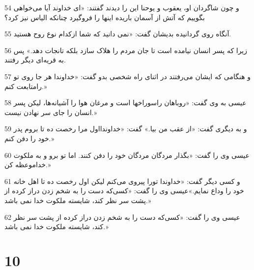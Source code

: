 \par 54 و چون شاگردان او، یعقوب و یوحنا این را دیدند گفتند: «ای خداوند آیا می‌خواهی بگوییم که آتش از آسمان باریده اینها را فرو‌گیرد چنانکه الیاس نیز کرد؟
\par 55 آنگاه روی گردانیده بدیشان گفت: «نمی دانید که شما ازکدام نوع روح هستید.
\par 56 زیرا که پسر انسان نیامده است تا جان مردم را هلاک سازد بلکه تانجات دهد.» پس به قریه‌ای دیگر رفتند.
\par 57 و هنگامی که ایشان می‌رفتند در اثنای راه شخصی بدو گفت: «خداوندا هر جا روی تو رامتابعت کنم.»
\par 58 عیسی به وی گفت: «روباهان راسوراخها است و مرغان هوا را آشیانه‌ها، لیکن پسر انسان را جای سر نهادن نیست.»
\par 59 و به دیگری گفت: «از عقب من بیا.» گفت: «خداوندااول مرا رخصت ده تا بروم پدر خود را دفن کنم.»
\par 60 عیسی وی را گفت: «بگذار مردگان مردگان خود را دفن کنند. اما تو برو و به ملکوت خداموعظه کن.»
\par 61 و کسی دیگر گفت: «خداوندا تورا پیروی می‌کنم لیکن اول رخصت ده تا اهل خانه خود را وداع نمایم.»عیسی وی را گفت: «کسی‌که دست را به شخم زدن دراز کرده از پشت سر نظر کند، شایسته ملکوت خدا نمی باشد.»
\par 62 عیسی وی را گفت: «کسی‌که دست را به شخم زدن دراز کرده از پشت سر نظر کند، شایسته ملکوت خدا نمی باشد.»

\chapter{10}

